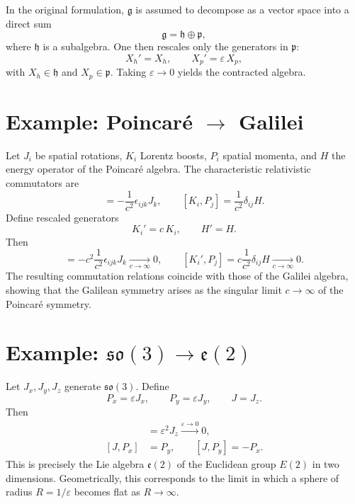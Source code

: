 \documentclass[11pt]{article}
\begin{document}
In the original formulation, $\mathfrak{g}$ is assumed to decompose as a vector
space into a direct sum
\begin{equation}
    \mathfrak{g} = \mathfrak{h} \oplus \mathfrak{p},
\end{equation}
where $\mathfrak{h}$ is a subalgebra.  One then rescales only the generators in
$\mathfrak{p}$:
\begin{equation}
   X_h' = X_h, \qquad
   X_p' = \varepsilon\, X_p,
\end{equation}
with $X_h \in \mathfrak{h}$ and $X_p \in \mathfrak{p}$.
Taking $\varepsilon \to 0$ yields the contracted algebra.

\section{Example: Poincar\'e \texorpdfstring{$\to$}{→} Galilei}

Let $J_i$ be spatial rotations, $K_i$ Lorentz boosts, $P_i$ spatial momenta,
and $H$ the energy operator of the Poincar\'e algebra.  The characteristic
relativistic commutators are
\begin{equation}
   [K_i,K_j] = - \frac{1}{c^2} \epsilon_{ijk} J_k,
   \qquad
   [K_i,P_j] = \frac{1}{c^2} \delta_{ij} H.
\end{equation}
Define rescaled generators
\begin{equation}
    K_i' = c\, K_i, \qquad H' = H.
\end{equation}
Then
\begin{equation}
   [K_i',K_j'] = - c^2 \frac{1}{c^2} \epsilon_{ijk} J_k
      \xrightarrow[c\to\infty]{} 0, 
   \qquad
   [K_i',P_j] = c \frac{1}{c^2} \delta_{ij} H
      \xrightarrow[c\to\infty]{} 0 .
\end{equation}
The resulting commutation relations coincide with those of the Galilei algebra,
showing that the Galilean symmetry arises as the singular limit $c\to\infty$
of the Poincar\'e symmetry.

\section{Example: \texorpdfstring{$\mathfrak{so}(3) \to \mathfrak{e}(2)$}{so(3)→e(2)}}

Let $J_x,J_y,J_z$ generate $\mathfrak{so}(3)$.  Define
\begin{equation}
    P_x = \varepsilon J_x, \qquad
    P_y = \varepsilon J_y, \qquad
    J = J_z.
\end{equation}
Then
\begin{align}
    [P_x,P_y] &= \varepsilon^2 J_z \xrightarrow{\varepsilon\to 0} 0, \\
    [J,P_x] &= P_y, \qquad [J,P_y] = - P_x.
\end{align}
This is precisely the Lie algebra $\mathfrak{e}(2)$ of the Euclidean group
$E(2)$ in two dimensions.  Geometrically, this corresponds to the limit in
which a sphere of radius $R = 1/\varepsilon$ becomes flat as $R\to\infty$.
\end{document}
